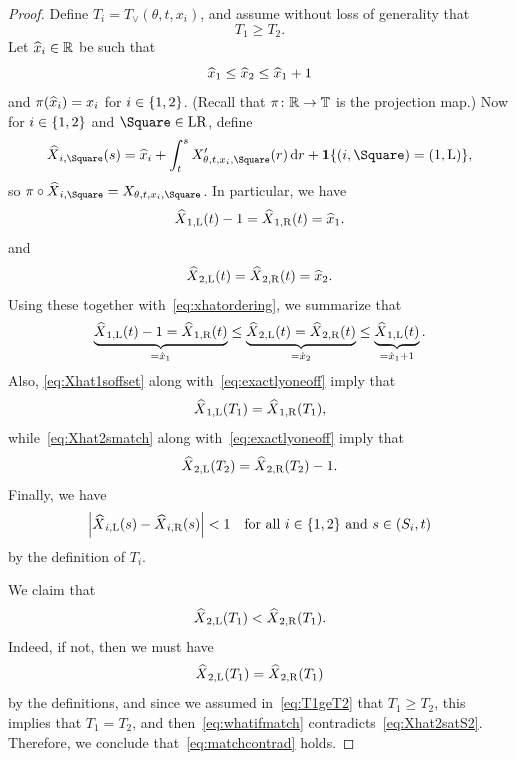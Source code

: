 \documentclass[AHL,Unicode,longabstracts]{cedram}
\newcommand*\TT{\mathbb{T}}
\newcommand*\RR{\mathbb{R}}
\newcommand{\bfun}{\mathbf{1}}
\newcommand*\dif{\mathrm{d}}
\newcommand*\Left{\mathrm{L}}
\newcommand*\Right{\mathrm{R}}
\newcommand*\LR{\mathrm{LR}}
\renewcommand*{\to}{\mathchoice{\longrightarrow}{\rightarrow}{\rightarrow}{\rightarrow}}
\let\oldin\in
\renewcommand{\in}{\mathchoice{\oldin}{\oldin}{\,\oldin\,}{\,\oldin\,}}
\let\originalleft\left
\let\originalright\right
\renewcommand{\left}{\mathopen{}\mathclose\bgroup\originalleft}
\renewcommand{\right}{\aftergroup\egroup\originalright}
\let\oldhat\hat
\renewcommand*{\hat}[1]{\mathchoice{\widehat{#1}}{\widehat{#1}}{\oldhat{#1}}{\oldhat{#1}}}
\newcommand*\TT{\mathbb{T}}
\newcommand*\RR{\mathbb{R}}
\begin{document}
\begin{proof}
Define $T_{i}=T_{\vee}(\theta,t,x_{i})$, and assume without loss of generality that
\begin{equation}\label{eq:T1geT2}
T_{1}\ge T_{2}.
\end{equation}
Let $\hat{x}_{i}\in\RR$ be such that
\begin{equation}\label{eq:xhatordering}
\hat{x}_{1}\le\hat{x}_{2}\le\hat{x}_{1}+1
\end{equation}
and $\pi(\hat{x}_{i})=x_{i}$ for $i\in\{1,2\}$. (Recall that $\pi\colon\RR\to\TT$ is the projection map.) Now for $i\in\{1,2\}$ and $\Square\in\LR$, define
\[
\hat{X}_{i,\Square}(s)=\hat{x}_{i}+\int_{t}^{s}X_{\theta,t,x_{i},\Square}'(r)\,\dif r+\bfun\{(i,\Square)=(1,\Left)\},
\]
so $\pi\circ\hat{X}_{i,\Square}=X_{\theta,t,x_{i},\Square}$. In particular, we have
\begin{equation}\label{eq:Xhat1soffset}
\hat{X}_{1,\Left}(t)-1=\hat{X}_{1,\Right}(t)=\hat{x}_{1}.
\end{equation}
and
\begin{equation}\label{eq:Xhat2smatch}
\hat{X}_{2,\Left}(t)=\hat{X}_{2,\Right}(t)=\hat{x}_{2}.
\end{equation}
Using these together with~\eqref{eq:xhatordering}, we summarize that
\begin{equation}\label{eq:initialordering}
\underbrace{\hat{X}_{1,\Left}(t)-1=\hat{X}_{1,\Right}(t)}_{=\hat{x}_{1}}\le\underbrace{\hat{X}_{2,\Left}(t)=\hat{X}_{2,\Right}(t)}_{=\hat{x}_{2}}\le\underbrace{\hat{X}_{1,\Left}(t)}_{=\hat{x}_{1}+1}.
\end{equation}
Also, \eqref{eq:Xhat1soffset} along with~\eqref{eq:exactlyoneoff} imply that
\begin{equation}\label{eq:Xhat1satS2}
\hat{X}_{1,\Left}(T_{1})=\hat{X}_{1,\Right}(T_{1}),
\end{equation}
while~\eqref{eq:Xhat2smatch} along with~\eqref{eq:exactlyoneoff} imply that
\begin{equation}\label{eq:Xhat2satS2}
\hat{X}_{2,\Left}(T_{2})=\hat{X}_{2,\Right}(T_{2})-1.
\end{equation}
Finally, we have
\[
\left|\hat{X}_{i,\Left}(s)-\hat{X}_{i,\Right}(s)\right|<1\quad\text{for all }i\in\{1,2\}\text{ and }s\in(S_{i},t)
\]
by the definition of $T_{i}$.

We claim that
\begin{equation}\label{eq:matchcontrad}
\hat{X}_{2,\Left}(T_{1})<\hat{X}_{2,\Right}(T_{1}).
\end{equation}
Indeed, if not, then we must have
\begin{equation}\label{eq:whatifmatch}
\hat{X}_{2,\Left}(T_{1})=\hat{X}_{2,\Right}(T_{1})
\end{equation}
by the definitions, and since we assumed in~\eqref{eq:T1geT2} that $T_{1}\ge T_{2}$, this implies that $T_{1}=T_{2}$, and then~\eqref{eq:whatifmatch} contradicts~\eqref{eq:Xhat2satS2}. Therefore, we conclude that~\eqref{eq:matchcontrad} holds.


\end{proof}
\end{document}

